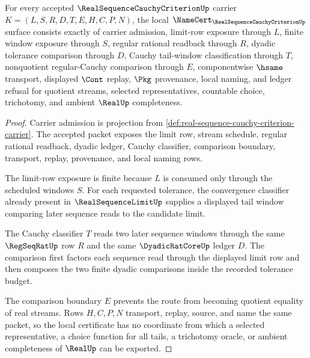 \begin{theorem}
\label{thm:real-sequence-cauchy-criterion-namecert-obligations}
For every accepted $\RealSequenceCauchyCriterionUp$ carrier $K=(L,S,R,D,T,E,H,C,P,N)$, the local $\NameCert_{\RealSequenceCauchyCriterionUp}$ surface consists exactly of carrier admission, limit-row exposure through $L$, finite window exposure through $S$, regular rational readback through $R$, dyadic tolerance comparison through $D$, Cauchy tail-window classification through $T$, nonquotient regular-Cauchy comparison through $E$, componentwise $\hsame$ transport, displayed $\Cont$ replay, $\Pkg$ provenance, local naming, and ledger refusal for quotient streams, selected representatives, countable choice, trichotomy, and ambient $\RealUp$ completeness.
\end{theorem}
\begin{proof}
Carrier admission is projection from \autoref{def:real-sequence-cauchy-criterion-carrier}. The accepted packet exposes the limit row, stream schedule, regular rational readback, dyadic ledger, Cauchy classifier, comparison boundary, transport, replay, provenance, and local naming rows.

The limit-row exposure is finite because $L$ is consumed only through the scheduled windows $S$. For each requested tolerance, the convergence classifier already present in $\RealSequenceLimitUp$ supplies a displayed tail window comparing later sequence reads to the candidate limit.

The Cauchy classifier $T$ reads two later sequence windows through the same $\RegSeqRatUp$ row $R$ and the same $\DyadicRatCoreUp$ ledger $D$. The comparison first factors each sequence read through the displayed limit row and then composes the two finite dyadic comparisons inside the recorded tolerance budget.

The comparison boundary $E$ prevents the route from becoming quotient equality of real streams. Rows $H,C,P,N$ transport, replay, source, and name the same packet, so the local certificate has no coordinate from which a selected representative, a choice function for all tails, a trichotomy oracle, or ambient completeness of $\RealUp$ can be exported.
\end{proof}


